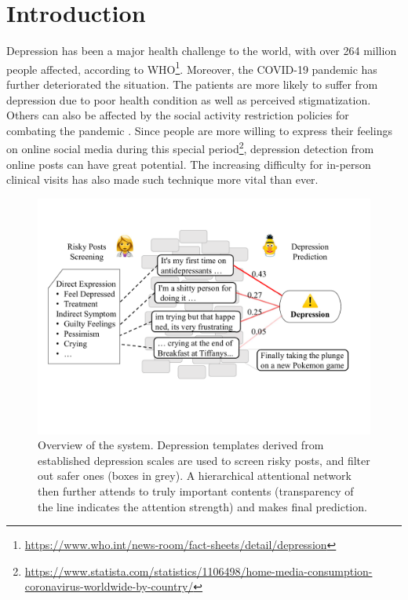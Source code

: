 
\section{Introduction}

Depression has been a major health challenge to the world, with over 264 million people affected, according to WHO\footnote{\url{https://www.who.int/news-room/fact-sheets/detail/depression}}. Moreover, the COVID-19 pandemic has further deteriorated the situation. The patients are more likely to suffer from depression due to poor health condition as well as perceived stigmatization. Others can also be affected by the social activity restriction policies for combating the pandemic \citep{zhou2021detecting}. Since people are more willing to express their feelings on online social media during this special period\footnote{\url{https://www.statista.com/statistics/1106498/home-media-consumption-coronavirus-worldwide-by-country/}}, depression detection from online posts can have great potential. The increasing difficulty for in-person clinical visits has also made such technique more vital than ever.

\begin{figure}[tbp]
    \centering
    \includegraphics[width=\columnwidth]{figures/overview1.pdf}
    \caption{Overview of the system. Depression templates derived from established depression scales are used to screen risky posts, and filter out safer ones (boxes in grey). A hierarchical attentional network then further attends to truly important contents (transparency of the line indicates the attention strength) and makes final prediction. }
    \label{fig:overview}
\end{figure}

